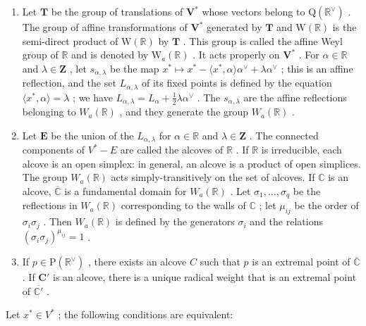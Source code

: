 \begin{enumerate}
\def\labelenumi{\arabic{enumi})}
\setcounter{enumi}{28}
\item
  Let \(\mathbf{T}\) be the group of translations of \(\mathbf{V}^*\) whose vectors belong to \(\mathrm{Q}(\mathbb{R}^{\vee})\) . The group of affine transformations of \(\mathbf{V}^*\) generated by \(\mathbf{T}\) and \(\mathrm{W}(\mathbb{R})\) is the semi-direct product of \(\mathrm{W}(\mathbb{R})\) by \(\mathbf{T}\) . This group is called the affine Weyl group of \(\mathbb{R}\) and is denoted by \(\mathrm{W}_a(\mathbb{R})\) . It acts properly on \(\mathbf{V}^*\) . For \(\alpha \in \mathbb{R}\) and \(\lambda \in \mathbf{Z}\) , let \(s_{\alpha, \lambda}\) be the map \(x^* \mapsto x^* - \langle x^*, \alpha \rangle \alpha^{\vee} + \lambda \alpha^{\vee}\) ; this is an affine reflection, and the set \(L_{\alpha, \lambda}\) of its fixed points is defined by the equation \(\langle x^*, \alpha \rangle = \lambda\) ; we have \(L_{\alpha, \lambda} = L_{\alpha} + \frac{1}{2}\lambda \alpha^{\vee}\) . The \(s_{\alpha, \lambda}\) are the affine reflections belonging to \(W_a(\mathbb{R})\) , and they generate the group \(W_a(\mathbb{R})\) .
\item
  Let \(\mathbf{E}\) be the union of the \(L_{\alpha, \lambda}\) for \(\alpha \in \mathbb{R}\) and \(\lambda \in \mathbf{Z}\) . The connected components of \(V^{*} - E\) are called the alcoves of \(\mathbb{R}\) . If \(\mathbb{R}\) is irreducible, each alcove is an open simplex: in general, an alcove is a product of open simplices. The group \(W_{a}(\mathbb{R})\) acts simply-transitively on the set of alcoves. If \(\mathbb{C}\) is an alcove, \(\overline{\mathbb{C}}\) is a fundamental domain for \(W_{a}(\mathbb{R})\) . Let \(\sigma_{1}, \ldots, \sigma_{q}\) be the reflections in \(W_{a}(\mathbb{R})\) corresponding to the walls of \(\mathbb{C}\) ; let \(\mu_{ij}\) be the order of \(\sigma_{i}\sigma_{j}\) . Then \(W_{a}(\mathbb{R})\) is defined by the generators \(\sigma_{i}\) and the relations \((\sigma_{i}\sigma_{j})^{\mu_{ij}} = 1\) .
\item
  If \(p \in \mathrm{P}(\mathbb{R}^{\vee})\) , there exists an alcove \(C\) such that \(p\) is an extremal point of \(\overline{\mathbb{C}}\) . If \(\mathbf{C}'\) is an alcove, there is a unique radical weight that is an extremal point of \(\overline{\mathbb{C}'}\) .
\end{enumerate}

Let \(x^{*} \in V^{*}\) ; the following conditions are equivalent:

